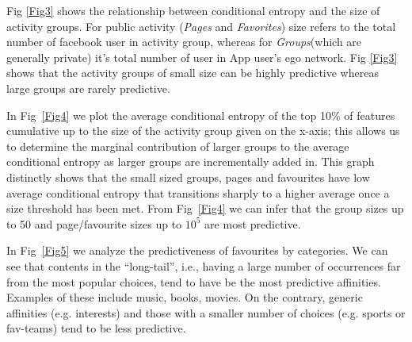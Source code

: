 




Fig \ref{Fig3} shows the relationship between conditional
    entropy and the size of activity groups. For public activity ({\em Pages} and 
    {\em Favorites}) size refers to the total number of facebook user in activity group, whereas
    for {\em Groups}(which are generally private) it's total number of user in App 
    user's ego network. Fig \ref{Fig3} shows that the activity groups of small 
    size can be highly predictive whereas large groups are rarely predictive.

In Fig~\ref{Fig4} we plot the average conditional entropy of the top
    10\% of features cumulative up to the size of the activity group given on the
    x-axis; this allows us to determine the marginal contribution of
    larger groups to the average conditional entropy as larger groups
    are incrementally added in.  This graph 
    distinctly shows that the small sized groups, pages and favourites
    have low average conditional entropy that transitions sharply to a
    higher average once a size threshold has been met. From 
    Fig~\ref{Fig4} we can infer that the group sizes up to 50 and
    page/favourite sizes up to $10^{5}$ are most predictive.
    
    
    In Fig~\ref{Fig5}  we analyze the predictiveness of favourites by categories.
    We can see that contents in the ``long-tail'', i.e.,  
    having a large number of occurrences far from the most popular choices, 
    tend to have be the most predictive affinities. Examples of these include
    music, books, movies. On the contrary, generic affinities (e.g. interests) and 
    those with a smaller number of choices (e.g. sports or fav-teams) 
    tend to be less predictive. 



